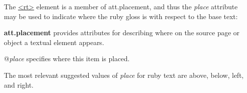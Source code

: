  The \hyperref[TEI.rt]{<rt>} element is a member of \textsf{att.placement}, and thus the {\itshape place} attribute may be used to indicate where the ruby gloss is with respect to the base text: 
\begin{sansreflist}
  
\item [\textbf{att.placement}] provides attributes for describing where on the source page or object a textual element appears.\hfil\\[-10pt]\begin{sansreflist}
    \item[@{\itshape place}]
  specifies where this item is placed.
\end{sansreflist}  
\end{sansreflist}
 The most relevant suggested values of {\itshape place} for ruby text are above, below, left, and right.\par
